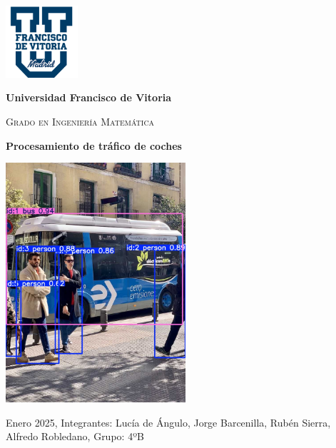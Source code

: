 
\begin{titlepage}
    \begin{center}
        \justify
        \vspace{1cm}
        
        \includegraphics[width=0.2\textwidth]{ImagenesLatex/ufv_logo}
        \vspace{1cm}
        
        \LARGE\textbf{Universidad Francisco de Vitoria}
        \vspace{0.5cm}
        
        \Large\textsc{Grado en Ingeniería Matemática}
        \vspace{1cm}
        
        
        \Huge\textbf{Procesamiento de tráfico de coches}

        \begin{center}
            \includegraphics[width=0.5\textwidth]{ImagenesLatex/bus.jpg}
        \end{center}

        \Large\textmd{Enero 2025, Integrantes: Lucía de Ángulo, Jorge Barcenilla, Rubén Sierra, Alfredo Robledano, Grupo: 4ºB}
        \vfill
        
    \end{center}
\end{titlepage}
